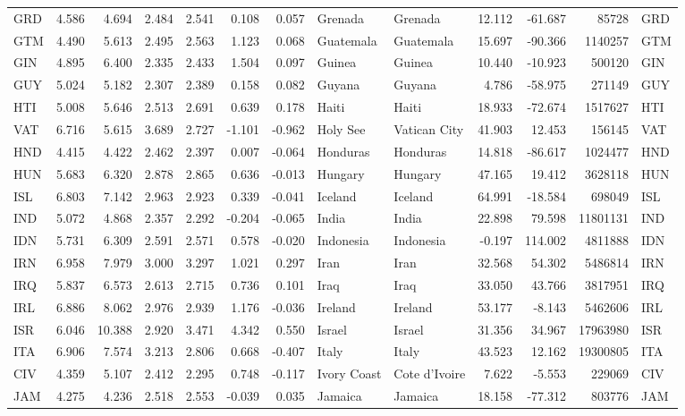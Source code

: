 \begin{tabular}{lrrrrrrllrrrl}
GRD & 4.586 & 4.694 & 2.484 & 2.541 & 0.108 & 0.057 & Grenada & Grenada & 12.112 & -61.687 & 85728 & GRD \\
GTM & 4.490 & 5.613 & 2.495 & 2.563 & 1.123 & 0.068 & Guatemala & Guatemala & 15.697 & -90.366 & 1140257 & GTM \\
GIN & 4.895 & 6.400 & 2.335 & 2.433 & 1.504 & 0.097 & Guinea & Guinea & 10.440 & -10.923 & 500120 & GIN \\
GUY & 5.024 & 5.182 & 2.307 & 2.389 & 0.158 & 0.082 & Guyana & Guyana & 4.786 & -58.975 & 271149 & GUY \\
HTI & 5.008 & 5.646 & 2.513 & 2.691 & 0.639 & 0.178 & Haiti & Haiti & 18.933 & -72.674 & 1517627 & HTI \\
VAT & 6.716 & 5.615 & 3.689 & 2.727 & -1.101 & -0.962 & Holy See & Vatican City & 41.903 & 12.453 & 156145 & VAT \\
HND & 4.415 & 4.422 & 2.462 & 2.397 & 0.007 & -0.064 & Honduras & Honduras & 14.818 & -86.617 & 1024477 & HND \\
HUN & 5.683 & 6.320 & 2.878 & 2.865 & 0.636 & -0.013 & Hungary & Hungary & 47.165 & 19.412 & 3628118 & HUN \\
ISL & 6.803 & 7.142 & 2.963 & 2.923 & 0.339 & -0.041 & Iceland & Iceland & 64.991 & -18.584 & 698049 & ISL \\
IND & 5.072 & 4.868 & 2.357 & 2.292 & -0.204 & -0.065 & India & India & 22.898 & 79.598 & 11801131 & IND \\
IDN & 5.731 & 6.309 & 2.591 & 2.571 & 0.578 & -0.020 & Indonesia & Indonesia & -0.197 & 114.002 & 4811888 & IDN \\
IRN & 6.958 & 7.979 & 3.000 & 3.297 & 1.021 & 0.297 & Iran & Iran & 32.568 & 54.302 & 5486814 & IRN \\
IRQ & 5.837 & 6.573 & 2.613 & 2.715 & 0.736 & 0.101 & Iraq & Iraq & 33.050 & 43.766 & 3817951 & IRQ \\
IRL & 6.886 & 8.062 & 2.976 & 2.939 & 1.176 & -0.036 & Ireland & Ireland & 53.177 & -8.143 & 5462606 & IRL \\
ISR & 6.046 & 10.388 & 2.920 & 3.471 & 4.342 & 0.550 & Israel & Israel & 31.356 & 34.967 & 17963980 & ISR \\
ITA & 6.906 & 7.574 & 3.213 & 2.806 & 0.668 & -0.407 & Italy & Italy & 43.523 & 12.162 & 19300805 & ITA \\
CIV & 4.359 & 5.107 & 2.412 & 2.295 & 0.748 & -0.117 & Ivory Coast & Cote d'Ivoire & 7.622 & -5.553 & 229069 & CIV \\
JAM & 4.275 & 4.236 & 2.518 & 2.553 & -0.039 & 0.035 & Jamaica & Jamaica & 18.158 & -77.312 & 803776 & JAM \\

\end{tabular}
